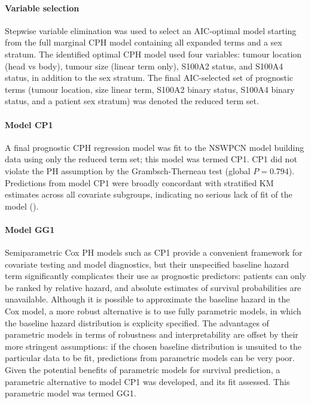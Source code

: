 \documentclass[dissertation.tex]{subfiles}
\begin{document}
\paragraph{Variable selection}
Stepwise variable elimination was used to select an AIC-optimal model starting from the full marginal \gls{CPH} model containing all expanded terms and a sex stratum.  The identified optimal \gls{CPH} model used four variables: tumour location (head vs body), tumour size (linear term only), S100A2 status, and S100A4 status, in addition to the sex stratum.  The final \gls{AIC}-selected set of prognostic terms (tumour location, size linear term, S100A2 binary status, S100A4 binary status, and a patient sex stratum) was denoted the reduced term set.

\paragraph{Model CP1}
A final prognostic \acrshort{CPH} regression model was fit to the \gls{NSWPCN} model building data using only the reduced term set; this model was termed CP1.  CP1 did not violate the \gls{PH} assumption by the Grambsch-Therneau test (global $P = 0.794$).  Predictions from model CP1 were broadly concordant with stratified \gls{KM} estimates across all covariate subgroups, indicating no serious lack of fit of the model ().

\paragraph{Model GG1}
Semiparametric Cox \gls{PH} models such as CP1 provide a convenient framework for covariate testing and model diagnostics, but their unspecified baseline hazard term significantly complicates their use as prognostic predictors: patients can only be ranked by relative hazard, and absolute estimates of survival probabilities are unavailable.  Although it is possible to approximate the baseline hazard in the Cox model, a more robust alternative is to use fully parametric models, in which the baseline hazard distribution is explicity specified.  The advantages of parametric models in terms of robustness and interpretability are offset by their more stringent assumptions: if the chosen baseline distribution is unsuited to the particular data to be fit, predictions from parametric models can be very poor.  Given the potential benefits of parametric models for survival prediction, a parametric alternative to model CP1 was developed, and its fit assessed.  This parametric model was termed GG1.
\end{document}
